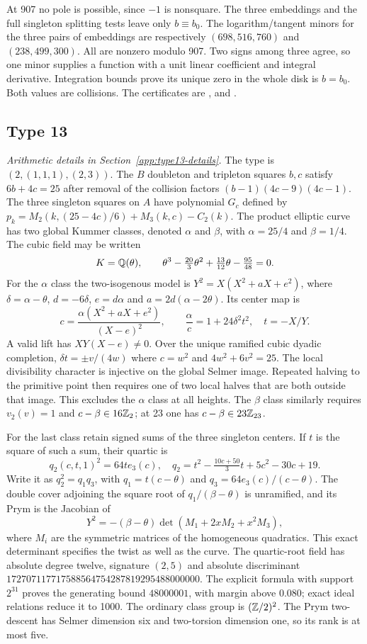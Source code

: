 At 907 no pole is possible, since $-1$ is nonsquare. The three
embeddings and the full singleton splitting tests leave only
$b\equiv b_0$. The logarithm/tangent minors for the three pairs
of embeddings are respectively $(698,516,760)$ and $(238,499,300)$.
All are nonzero modulo 907. Two signs among three agree, so one
minor supplies a function with a unit linear coefficient and integral
derivative. Integration bounds prove its unique zero in the whole
disk is $b=b_0$. Both values are collisions.
The certificates are ,
 and .

\subsection{Type 13}\label{app:type13}
\noindent\emph{Arithmetic details in Section~\ref{app:type13-details}.}\enspace
The type is $(2,(1,1,1),(2,3))$. The $B$ doubleton and tripleton
squares $b,c$ satisfy $6b+4c=25$ after removal of the collision
factors $(b-1)(4c-9)(4c-1)$. The three singleton squares on $A$
have polynomial $G_c$ defined by
$p_k=M_2(k,(25-4c)/6)+M_3(k,c)-C_2(k)$.
The product elliptic curve has two global Kummer classes, denoted
$\alpha$ and $\beta$, with $\alpha=25/4$ and $\beta=1/4$.
The cubic field may be written
\[
 K=\mathbb Q(\theta),\qquad
 \theta^3-\tfrac{20}{3}\theta^2+\tfrac{13}{12}\theta-\tfrac{95}{48}=0.
\]
For the $\alpha$ class the two-isogenous model is
$Y^2=X(X^2+aX+e^2)$, where
$\delta=\alpha-\theta$, $d=-6\delta$, $e=d\alpha$ and
$a=2d(\alpha-2\theta)$. Its center map is
\[
 c=\frac{\alpha(X^2+aX+e^2)}{(X-e)^2},\qquad
 \frac{\alpha}{c}=1+24\delta^2t^2,\quad t=-X/Y.
\]
A valid lift has $XY(X-e)\ne0$. Over the unique ramified cubic
dyadic completion, $\delta t=\pm v/(4w)$ where $c=w^2$ and
$4w^2+6v^2=25$. The local divisibility character is injective on
the global Selmer image. Repeated halving to the primitive point
then requires one of two local halves that are both outside that
image. This excludes the $\alpha$ class at all heights.
The $\beta$ class similarly requires $v_2(v)=1$ and
$c-\beta\in16\mathbb Z_2$; at 23 one has $c-\beta\in23\mathbb Z_{23}$.

For the last class retain signed sums of the three singleton centers.
If $t$ is the square of such a sum, their quartic is
\[
 q_2(c,t,1)^2=64t e_3(c),\quad
 q_2=t^2-\tfrac{10c+50}{3}t+5c^2-30c+19.
\]
Write it as $q_2^2=q_1q_3$, with
$q_1=t(c-\theta)$ and $q_3=64e_3(c)/(c-\theta)$.
The double cover adjoining the square root of
$q_1/(\beta-\theta)$ is unramified, and its Prym is the Jacobian
of
\[
 Y^2=-(\beta-\theta)\det(M_1+2xM_2+x^2M_3),
\]
where $M_i$ are the symmetric matrices of the homogeneous quadratics.
This exact determinant specifies the twist as well as the curve.
The quartic-root field has absolute degree twelve, signature $(2,5)$
and absolute discriminant
$172707117717588564754287819295488000000$.
The explicit formula with support $2^{31}$ proves the generating
bound $48000001$, with margin above $0.080$; exact ideal relations
reduce it to 1000. The ordinary class group is $(\mathbb Z/2)^2$.
The Prym two-descent has Selmer dimension six and two-torsion
dimension one, so its rank is at most five.

